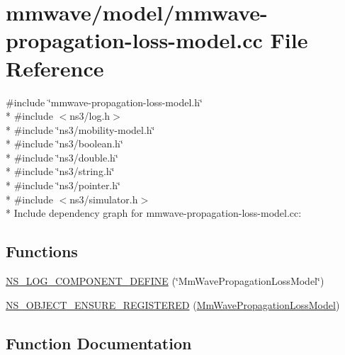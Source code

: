 \hypertarget{mmwave-propagation-loss-model_8cc}{}\section{mmwave/model/mmwave-\/propagation-\/loss-\/model.cc File Reference}
\label{mmwave-propagation-loss-model_8cc}
{\ttfamily \#include \char`\"{}mmwave-\/propagation-\/loss-\/model.\+h\char`\"{}}\\*
{\ttfamily \#include $<$ns3/log.\+h$>$}\\*
{\ttfamily \#include \char`\"{}ns3/mobility-\/model.\+h\char`\"{}}\\*
{\ttfamily \#include \char`\"{}ns3/boolean.\+h\char`\"{}}\\*
{\ttfamily \#include \char`\"{}ns3/double.\+h\char`\"{}}\\*
{\ttfamily \#include \char`\"{}ns3/string.\+h\char`\"{}}\\*
{\ttfamily \#include \char`\"{}ns3/pointer.\+h\char`\"{}}\\*
{\ttfamily \#include $<$ns3/simulator.\+h$>$}\\*
Include dependency graph for mmwave-\/propagation-\/loss-\/model.cc\+:
\subsection*{Functions}
\begin{DoxyCompactItemize}
\item 
\hyperlink{mmwave-propagation-loss-model_8cc_a4a84b7882f5f9a4e7bcec18353f3cd3b}{N\+S\+\_\+\+L\+O\+G\+\_\+\+C\+O\+M\+P\+O\+N\+E\+N\+T\+\_\+\+D\+E\+F\+I\+NE} (\char`\"{}Mm\+Wave\+Propagation\+Loss\+Model\char`\"{})
\item 
\hyperlink{mmwave-propagation-loss-model_8cc_a58e740f477676e27f7558ac781b48dd0}{N\+S\+\_\+\+O\+B\+J\+E\+C\+T\+\_\+\+E\+N\+S\+U\+R\+E\+\_\+\+R\+E\+G\+I\+S\+T\+E\+R\+ED} (\hyperlink{classMmWavePropagationLossModel}{Mm\+Wave\+Propagation\+Loss\+Model})
\end{DoxyCompactItemize}


\subsection{Function Documentation}
